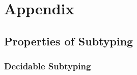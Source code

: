 \chapter{Appendix}

\section{Properties of Subtyping}\label{sec:app:proofs}

\subsection{Decidable Subtyping}\label{subsec:app:proofs:dec}

